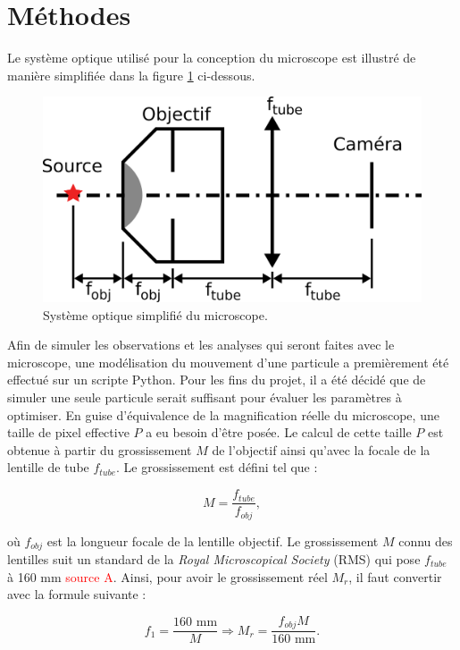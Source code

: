\documentclass[conference]{IEEEtran}
\begin{document}
\section{Méthodes \label{methodes}}
Le système optique utilisé pour la conception du microscope est illustré de manière simplifiée
dans la figure \ref{sys} ci-dessous.
\begin{figure}[H]
  \centering
  \includegraphics[scale=2.3]{systeme.png}
  \caption{Système optique simplifié du microscope.}
  \label{sys}
\end{figure}
Afin de simuler les observations et les analyses qui seront faites avec le microscope,
une modélisation du mouvement d'une particule a premièrement été effectué sur un scripte Python.
Pour les fins du projet, il a été décidé que de simuler une seule particule serait suffisant pour
évaluer les paramètres à optimiser. En guise d'équivalence de la magnification réelle du microscope, 
une taille de pixel effective $P$ a eu besoin d'être posée. Le calcul de cette taille $P$ est obtenue à partir du grossissement $M$ de l'objectif ainsi qu'avec la
focale de la lentille de tube $f_{tube}$. Le grossissement est défini tel que :

\begin{equation}
  M = \frac{f_{tube}}{f_{obj}},
\end{equation}

où $f_{obj}$ est la longueur focale de la lentille objectif. Le grossissement $M$ connu des lentilles suit
un standard de la \textit{Royal Microscopical Society} (RMS) qui pose $f_{tube}$ à 160 mm
\textcolor{red}{source A}. Ainsi, pour avoir le grossissement réel $M_{r}$, il faut convertir avec la 
formule suivante :


\begin{equation}
  f_{1}= \frac{160 \text{ mm} }{M} \Rightarrow M_{r} = \frac{f_{obj}M}{160 \text{ mm} }.
\end{equation}
\end{document}
